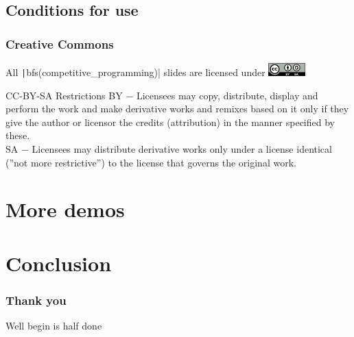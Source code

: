 \documentclass{beamer}
\newenvironment{cppcode}[2]
{\VerbatimEnvironment \begin{verbatim}}
{\end{verbatim}}
\begin{document}
\subsection{Conditions for use}

\begin{frame}
    \frametitle{Creative Commons}
    All \texttt|bfs(competitive_programming)| slides are licensed under \includegraphics[height=0.5cm]{CC-BY-SA_icon.png}
    \begin{alertblock}{CC-BY-SA Restrictions}
        \alert{BY} $-$ Licensees may copy, distribute, display and perform the work and make derivative works and remixes based on it only if they give the author or licensor the credits (attribution) in the manner specified by these. \\
        \alert{SA} $-$ Licensees may distribute derivative works only under a license identical (''not more restrictive'') to the license that governs the original work.  \\
    \end{alertblock}
\end{frame}

\section{More demos}

\section{Conclusion}
\begin{frame}
    \frametitle{Thank you}
    Well begin is half done
\end{frame}
\end{document}
